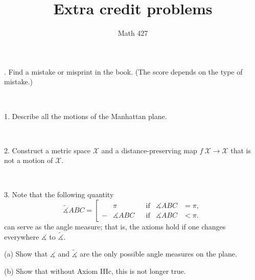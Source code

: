 \documentclass[oneside,a4paper]{article}
\begin{document}
\title{Extra credit problems}
\author{Math 427}
\date{}
\maketitle


. Find a mistake or misprint in the book.
(The score depends on the type of mistake.)

\ 

\noi %
{1.} Describe all the motions of the Manhattan plane.

\ 

\noi %
{2.} %
Construct a metric space $\mathcal X$ and a distance-preserving map $f\:\mathcal X\to \mathcal X$ that is not a motion of $\mathcal X$.

\ 

\noi %
{3.} Note that the following quantity 
$$\tilde
\measuredangle ABC=\left[
\begin{aligned}
&\pi&&\text{if}&\measuredangle ABC&=\pi,
\\
-&\measuredangle ABC&&\text{if}&\measuredangle ABC&<\pi.
\end{aligned}
\right.$$
can serve as the angle measure; 
that is, the axioms hold if one changes everywhere $\measuredangle$ to $\tilde\measuredangle$.

\noi (a) Show that $\measuredangle$ and $\tilde\measuredangle$ are the only possible angle measures on the plane. 

\noi (b) Show that without Axiom IIIc, this is not longer true.

\ 
\end{document}
